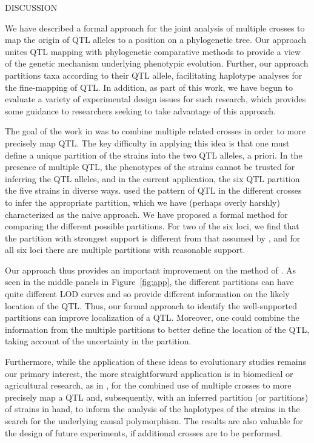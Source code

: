 \documentclass[12pt,letterpaper]{article}
\begin{document}
\clearpage
\centerline{DISCUSSION}

We have described a formal approach for the joint analysis of multiple
crosses to map the
origin of QTL alleles to a position on a phylogenetic tree.  
Our approach unites QTL mapping with phylogenetic
comparative methods to provide a view of the genetic mechanism
underlying phenotypic evolution.  Further, our approach partitions
taxa according to their QTL allele, facilitating haplotype analyses
for the fine-mapping of QTL. In addition, as part of this work, we
have begun to evaluate a variety of experimental design issues for
such research, which provides some guidance to researchers seeking to
take advantage of this approach.

The goal of the work in \citet{Li2005} was to combine multiple related
crosses in order to more precisely map QTL.  The key difficulty in
applying this idea is that one must define a unique partition of the
strains into the two QTL alleles, a priori.  In the presence of multiple QTL,
the phenotypes of the strains cannot be trusted for inferring the QTL
alleles, and in the current application, the six QTL partition the
five strains in diverse ways.  \citet{Li2005} used the pattern of QTL
in the different crosses to infer the appropriate partition, which we
have (perhaps overly harshly) characterized as the naive approach.  We
have proposed a formal method for comparing the different possible
partitions.  For two of the six loci, we find that the partition with
strongest support is different from that assumed by \citet{Li2005},
and for all six loci there are multiple partitions with reasonable
support.

Our approach thus provides an important improvement on the method of
\citet{Li2005}.  As seen in the middle panels in Figure~\ref{fig:app},
the different partitions can have quite different LOD curves and so
provide different information on the likely location of the QTL.
Thus, our formal approach to identify the well-supported partitions can
improve localization of a QTL.  Moreover, one could
combine the information from the multiple partitions to better define
the location of the QTL, taking account of the uncertainty in the
partition.  

Furthermore, while the application of these ideas to evolutionary
studies remains our primary interest, the more straightforward
application is in biomedical or agricultural research, as in \citet{Li2005}, for the
combined use of multiple crosses to more precisely map a QTL and,
subsequently, with an inferred partition (or partitions) of strains in
hand, to inform the analysis of the haplotypes of the strains
\citep[see, for example,][]{burgess2008} in the
search for the underlying causal polymorphism.  The results are also
valuable for the design of future experiments, if additional crosses
are to be performed.
\end{document}
